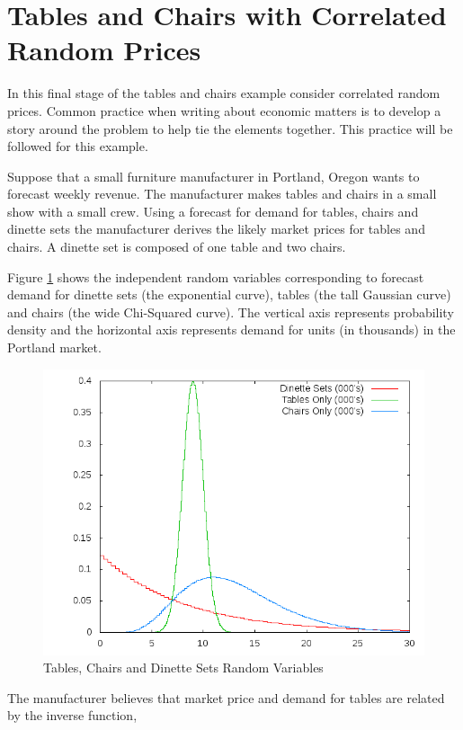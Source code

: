 \section{Tables and Chairs with Correlated Random Prices}

In this final stage of the tables and chairs example consider correlated random prices. Common practice when writing about economic matters is to develop a story around the problem to help tie the elements together. This practice will be followed for this example.

Suppose that a small furniture manufacturer in Portland, Oregon wants to forecast weekly revenue. The manufacturer makes tables and chairs in a small show with a small crew. Using a forecast for demand for tables, chairs and dinette sets the manufacturer derives the likely market prices for tables and chairs. A dinette set is composed of one table and two chairs.

Figure \ref{fig:TCD} shows the independent random variables corresponding to forecast demand for dinette sets (the exponential curve), tables (the tall Gaussian curve) and chairs (the wide Chi-Squared curve). The vertical axis represents probability density and the horizontal axis represents demand for units (in thousands) in the Portland market.

\begin{figure}
  \centering
  \includegraphics[width=120mm]{Images/TCD}
  \caption[Tables, Chairs and Dinette Sets Random Variables]
          {Tables, Chairs and Dinette Sets Random Variables}
  \label{fig:TCD}
\end{figure}

The manufacturer believes that market price and demand for tables are related by the inverse function,

